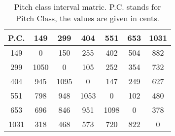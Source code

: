 \begin{table}
\begin{tabular}{c||  c  c  c  c  c  c  }	
P.C. & 149 & 299 & 404 & 551 & 653 & 1031 \\
\hline
\hline
149 & 0 & 150 & 255 & 402 & 504 & 882\\
299 & 1050 & 0 & 105 & 252 & 354 & 732\\
404 & 945 & 1095 & 0 & 147 & 249 & 627\\
551 & 798 & 948 & 1053 & 0 & 102 & 480\\
653 & 696 & 846 & 951 & 1098 & 0 & 378\\
1031 & 318 & 468 & 573 & 720 & 822 & 0     	
\end{tabular}
\label{tbl:pitch_class_interval_matrix}
\caption{Pitch class interval matric. P.C. stands for Pitch Class, the values are given in cents.}
\end{table}
